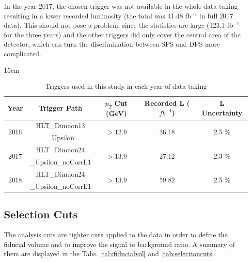 In the year 2017, the chosen trigger was not available in the whole data-taking resulting in a lower recorded luminosity (the total was 41.48 fb$^{-1}$ in full 2017 data). This should not pose a problem, since the statistics are large (123.1 fb$^{-1}$ for the three years) and the other triggers did only cover the central area of the detector, which can turn the discrimination between SPS and DPS more complicated.

\begin{table}[!htbp]{15cm}
  \caption{Triggers used in this study in each year of data taking}
  \begin{tabular}{ c | c | c | c | c }
    Year                     & Trigger Path        & $p_T$ Cut (GeV)             & Recorded L ($fb^{-1}$)    & L Uncertainty              \\  \hline
    \multirow[c]{2}{*}{2016} & HLT\_Dimuon13       & \multirow[c]{2}{*}{$>12.9$} & \multirow[c]{2}{*}{36.18} & \multirow[c]{2}{*}{2.5 \%} \\
                             & \_Upsilon           &                             &                                                        \\ \hline
    \multirow[c]{2}{*}{2017} & HLT\_Dimuon24       & \multirow[c]{2}{*}{$>13.9$} & \multirow[c]{2}{*}{27.12} & \multirow[c]{2}{*}{2.3 \%} \\
                             & \_Upsilon\_noCorrL1 &                             &                           &                            \\ \hline
    \multirow[c]{2}{*}{2018} & HLT\_Dimuon24       & \multirow[c]{2}{*}{$>13.9$} & \multirow[c]{2}{*}{59.82} & \multirow[c]{2}{*}{2.5 \%} \\
                             & \_Upsilon\_noCorrL1 &                             &                           &                            \\ \hline
  \end{tabular}
  \label{tab:triggers}
\end{table}

\subsection{Selection Cuts} \label{sec:selcuts}

The analysis cuts are tighter cuts applied to the data in order to define the fiducial volume and to improve the signal to background ratio. A summary of them are displayed in the Tabs. \ref{tab:fiducialvol} and \ref{tab:selectioncuts}.

